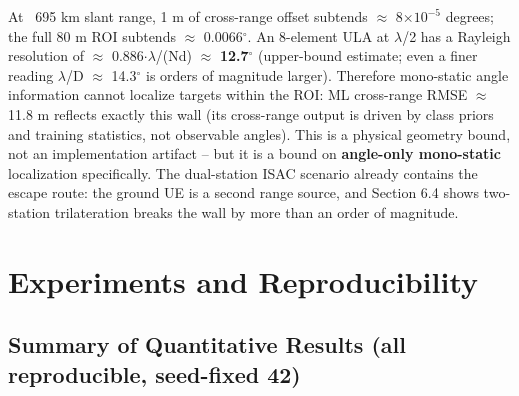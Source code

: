 \documentclass[11pt]{article}
\begin{document}
At ~695 km slant range, 1 m of cross-range offset subtends $\approx$ 8$\times$$10^{-5}$ degrees; the full 80 m ROI subtends $\approx$ 0.0066$^\circ$. An 8-element ULA at $\lambda$/2 has a Rayleigh resolution of $\approx$ 0.886$\cdot$$\lambda$/(Nd) $\approx$ \textbf{12.7$^\circ$} (upper-bound estimate; even a finer reading $\lambda$/D $\approx$ 14.3$^\circ$ is orders of magnitude larger). Therefore mono-static angle information cannot localize targets within the ROI: ML cross-range RMSE $\approx$ 11.8 m reflects exactly this wall (its cross-range output is driven by class priors and training statistics, not observable angles). This is a physical geometry bound, not an implementation artifact -- but it is a bound on \textbf{angle-only mono-static} localization specifically. The dual-station ISAC scenario already contains the escape route: the ground UE is a second range source, and Section 6.4 shows two-station trilateration breaks the wall by more than an order of magnitude.


\section{Experiments and Reproducibility}

\subsection{Summary of Quantitative Results (all reproducible, seed-fixed 42)}
\end{document}
